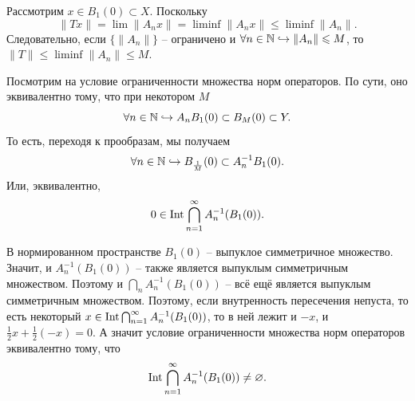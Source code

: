\begin{note}
    Рассмотрим $x \in B_1(0) \subset X$.
    Поскольку
    \[
        \|Tx\| = \lim \|A_n x\| = \liminf \|A_n x\| \leq \liminf \|A_n\|.
    \]
    Следовательно, если $\{\|A_n\|\}$ -- ограничено и $\forall n \in \mathbb{N} \hookrightarrow \|A_n\| \leqslant M$, то $\|T\| \leq \liminf \|A_n\| \leq M$.

    Посмотрим на условие ограниченности множества норм операторов.
    По сути, оно эквивалентно тому, что при некотором $M$
    \[
        \forall n \in \mathbb{N} \hookrightarrow A_n B_1(0) \subset B_M(0) \subset Y.
    \]
    То есть, переходя к прообразам, мы получаем
    \[
        \forall n \in \mathbb{N} \hookrightarrow B_\frac{1}{M}(0) \subset A_n^{-1} B_1(0).
    \]
    Или, эквивалентно,
    \[
        0 \in \operatorname{Int} \bigcap_{n = 1}^{\infty} A_n^{-1}(B_1(0)).
    \]

    В нормированном пространстве $B_1(0)$ -- выпуклое симметричное множество.
    Значит, и $A_n^{-1}(B_1(0))$ -- также является выпуклым симметричным множеством.
    Поэтому и $\bigcap_{n} A_n^{-1}(B_1(0))$ -- всё ещё является выпуклым симметричным множеством.
    Поэтому, если внутренность пересечения непуста, то есть некоторый $x \in \operatorname{Int} \bigcap_{n = 1}^{\infty} A_n^{-1}(B_1(0))$, то в ней лежит и $-x$, и $\frac{1}{2}x + \frac{1}{2}(-x) = 0$.
    А значит условие ограниченности множества норм операторов эквивалентно тому, что
    \[
        \operatorname{Int} \bigcap_{n = 1}^{\infty} A_n^{-1}(B_1(0)) \neq \varnothing.
    \]
\end{note}
